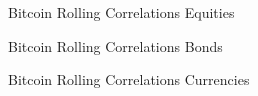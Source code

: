 \documentclass[c, 10pt]{beamer}
\begin{document}
\begin{frame}{Bitcoin Rolling Correlations}
Equities
\begin{figure}
	\centering
	\noindent{}
\end{figure}
\end{frame}
\begin{frame}{Bitcoin Rolling Correlations}
Bonds
\begin{figure}
	\centering
	\noindent{}
\end{figure}
\end{frame}
\begin{frame}{Bitcoin Rolling Correlations}
Currencies
	\begin{figure}
		\centering
		\noindent{}
	\end{figure}
	\end{frame}
\end{document}
